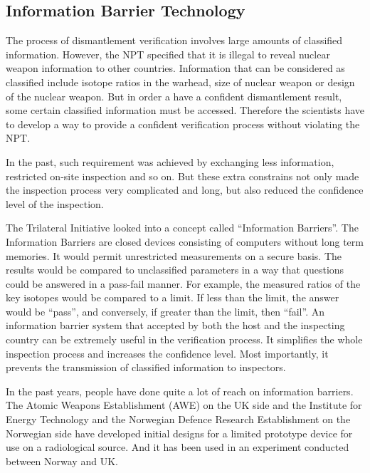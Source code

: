 \documentclass[twoside,titlepage,11pt,twocolumn,a4paper]{article}
\begin{document}
\subsection{Information Barrier Technology}
The process of dismantlement verification involves large amounts of
classified information. However, the NPT specified that it is illegal
to reveal nuclear weapon information to other countries. Information
that can be considered as classified include isotope ratios in the
warhead, size of nuclear weapon or design of the nuclear weapon. But
in order a have a confident dismantlement result, some certain
classified information must be accessed. Therefore the scientists have
to develop a way to provide a confident verification process without
violating the NPT.

In the past, such requirement was achieved by exchanging less
information, restricted on-site inspection and so on. But these extra
constrains not only made the inspection process very complicated and
long, but also reduced the confidence level of the inspection.

The Trilateral Initiative looked into a concept called ``Information
Barriers''. The Information Barriers are closed devices consisting of
computers without long term memories. It would permit unrestricted
measurements on a secure basis. The results would be compared to
unclassified parameters in a way that questions could be answered in a
pass-fail manner. \citep{SUW2005} For example, the measured ratios of
the key isotopes would be compared to a limit. If less than the limit,
the answer would be ``pass'', and conversely, if greater than the
limit, then ``fail''. An information barrier system that accepted by
both the host and the inspecting country can be extremely useful in
the verification process. It simplifies the whole inspection process
and increases the confidence level. Most importantly, it prevents the
transmission of classified information to inspectors.


In the past years, people have done quite a lot of reach on
information barriers. The Atomic Weapons Establishment (AWE) on the UK 
side and the Institute for
Energy Technology and the Norwegian Defence Research Establishment on
the Norwegian side have developed initial designs for a limited
prototype device for use on a radiological source. And it has been
used in an experiment conducted between Norway and UK.
\end{document}
